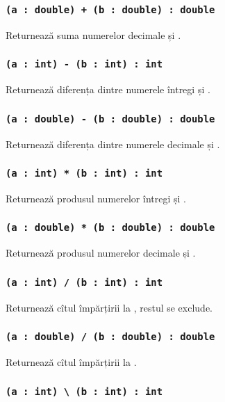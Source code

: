 \subsubsection{\lstinline|(a : double) + (b : double) : double|}

Returnează suma numerelor decimale  și .

\subsubsection{\lstinline|(a : int) - (b : int) : int|}

Returnează diferența dintre numerele întregi  și .

\subsubsection{\lstinline|(a : double) - (b : double) : double|}

Returnează diferența dintre numerele decimale  și .

\subsubsection{\lstinline|(a : int) * (b : int) : int|}

Returnează produsul numerelor întregi  și .

\subsubsection{\lstinline|(a : double) * (b : double) : double|}

Returnează produsul numerelor decimale  și .

\subsubsection{\lstinline|(a : int) / (b : int) : int|}

Returnează cîtul împărțirii  la , restul se exclude.

\subsubsection{\lstinline|(a : double) / (b : double) : double|}

Returnează cîtul împărțirii  la .

\subsubsection{\lstinline|(a : int) \ (b : int) : int|}

